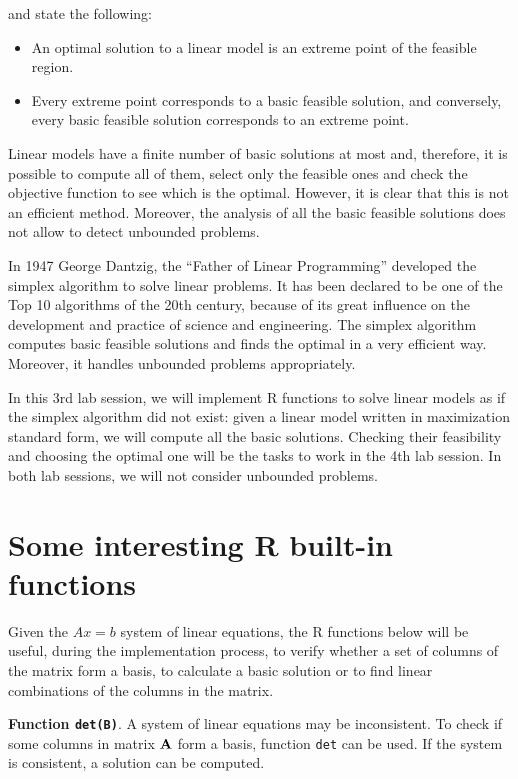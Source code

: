 \documentclass[
]{article}
\begin{document}
and state the following:

\begin{itemize}
\item An optimal solution to a linear model is an extreme point of the feasible region.
\item Every extreme point corresponds to a basic feasible solution, and conversely, every basic feasible solution corresponds to an extreme point.
\end{itemize}

Linear models have a finite number of basic solutions at most and,
therefore, it is possible to compute all of them, select only the
feasible ones and check the objective function to see which is the
optimal. However, it is clear that this is not an efficient method.
Moreover, the analysis of all the basic feasible solutions does not
allow to detect unbounded problems.

In 1947 George Dantzig, the ``Father of Linear Programming'' developed
the simplex algorithm to solve linear problems. It has been declared to
be one of the Top 10 algorithms of the 20th century, because of its
great influence on the development and practice of science and
engineering. The simplex algorithm computes basic feasible solutions and
finds the optimal in a very efficient way. Moreover, it handles
unbounded problems appropriately.

In this 3rd lab session, we will implement R functions to solve linear
models as if the simplex algorithm did not exist: given a linear model
written in maximization standard form, we will compute all the basic
solutions. Checking their feasibility and choosing the optimal one will
be the tasks to work in the 4th lab session. In both lab sessions, we
will not consider unbounded problems.

\hypertarget{some-interesting-r-built-in-functions}{%
\section{Some interesting R built-in
functions}\label{some-interesting-r-built-in-functions}}

Given the \(Ax=b\) system of linear equations, the R functions below
will be useful, during the implementation process, to verify whether a
set of columns of the matrix form a basis, to calculate a basic solution
or to find linear combinations of the columns in the matrix.

\textbf{Function \texttt{det(B)}}. A system of linear equations may be
inconsistent. To check if some columns in matrix \({\bf A}\) form a
basis, function \texttt{det} can be used. If the system is consistent, a
solution can be computed.
\end{document}
